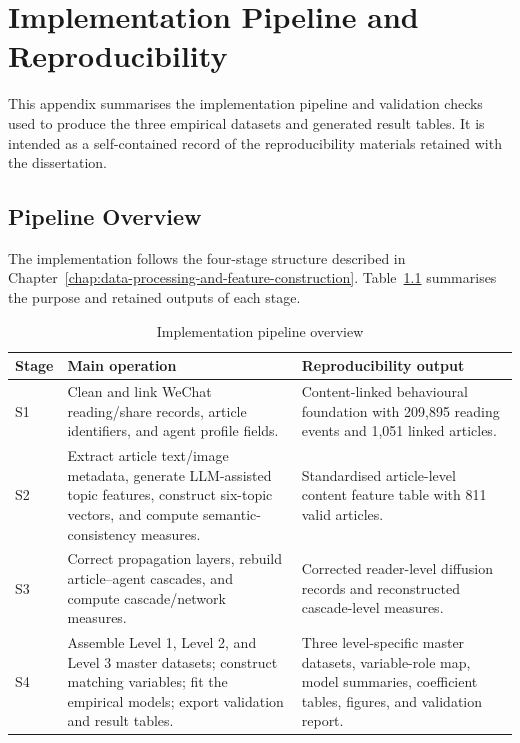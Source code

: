 \chapter{Implementation Pipeline and Reproducibility}
\label{app:implementation-reproducibility}

This appendix summarises the implementation pipeline and validation checks used to produce the three empirical datasets and generated result tables. It is intended as a self-contained record of the reproducibility materials retained with the dissertation.

\section{Pipeline Overview}
\label{app:b-pipeline-overview}

The implementation follows the four-stage structure described in Chapter~\ref{chap:data-processing-and-feature-construction}. Table~\ref{tab:app-b-pipeline-overview} summarises the purpose and retained outputs of each stage.

\begin{table}[H]
\centering
\small
\caption{Implementation pipeline overview}
\label{tab:app-b-pipeline-overview}
\renewcommand{\arraystretch}{1.18}
\begin{tabularx}{\textwidth}{>{\raggedright\arraybackslash}p{}>{\raggedright\arraybackslash}p{}>{\raggedright\arraybackslash}X}
\toprule
Stage & Main operation & Reproducibility output \\
\midrule
S1 & Clean and link WeChat reading/share records, article identifiers, and agent profile fields. & Content-linked behavioural foundation with 209,895 reading events and 1,051 linked articles. \\
S2 & Extract article text/image metadata, generate LLM-assisted topic features, construct six-topic vectors, and compute semantic-consistency measures. & Standardised article-level content feature table with 811 valid articles. \\
S3 & Correct propagation layers, rebuild article--agent cascades, and compute cascade/network measures. & Corrected reader-level diffusion records and reconstructed cascade-level measures. \\
S4 & Assemble Level 1, Level 2, and Level 3 master datasets; construct matching variables; fit the empirical models; export validation and result tables. & Three level-specific master datasets, variable-role map, model summaries, coefficient tables, figures, and validation report. \\
\bottomrule
\end{tabularx}
\end{table}

